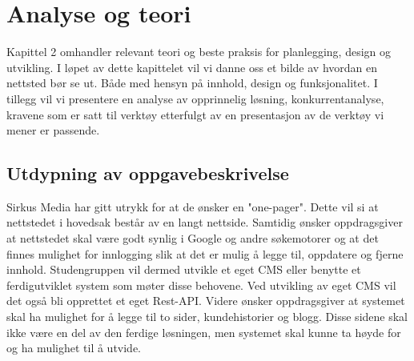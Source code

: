 \cleardoublepage
\chapter{Analyse og teori}
\label{chap:analysis}



Kapittel 2 omhandler relevant teori og beste praksis for planlegging, design og utvikling. I løpet av dette kapittelet vil vi danne oss et bilde av hvordan en nettsted bør se ut. Både med hensyn på innhold, design og funksjonalitet. I tillegg vil vi presentere en analyse av opprinnelig løsning, konkurrentanalyse, kravene som er satt til verktøy etterfulgt av en presentasjon av de verktøy vi mener er passende.

\section{Utdypning av oppgavebeskrivelse}
Sirkus Media har gitt utrykk for at de ønsker en "one-pager". Dette vil si at nettstedet i hovedsak består av en langt nettside. Samtidig ønsker oppdragsgiver at nettstedet skal være godt synlig i Google og andre søkemotorer og at det finnes mulighet for innlogging slik at det er mulig å legge til, oppdatere og fjerne innhold. Studengruppen vil dermed utvikle et eget CMS eller benytte et ferdigutviklet system som møter disse behovene. Ved utvikling av eget CMS vil det også bli opprettet et eget Rest-API. Videre ønsker oppdragsgiver at systemet skal ha mulighet for å legge til to sider, kundehistorier og blogg. Disse sidene skal ikke være en del av den ferdige løsningen, men systemet skal kunne ta høyde for og ha mulighet til å utvide.

